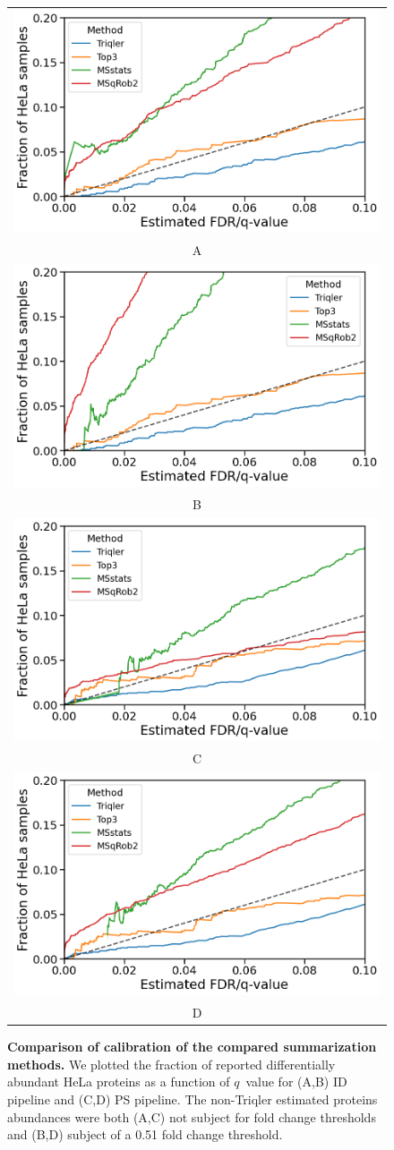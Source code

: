 \documentclass[11pt]{article}
\begin{document}
\begin{figure}[hbt]
    \centering
    \centering
    \begin{tabular}{c} 
        \includegraphics[width=0.5\linewidth]{../../result/report_plots_pipeline/calibration_ID_0.png} \\
        A \\ 
        \includegraphics[width=0.5\linewidth]{../../result/report_plots_pipeline/calibration_ID_0.51.png} \\
        B \\
        \includegraphics[width=0.5\linewidth]{../../result/report_plots_pipeline/calibration_PS_0.png} \\
        C \\
        \includegraphics[width=0.5\linewidth]{../../result/report_plots_pipeline/calibration_PS_0.51.png} \\
        D 
    \end{tabular}
  \caption{{\bf Comparison of calibration of the compared summarization methods.} We plotted the fraction of reported differentially abundant HeLa proteins as a function of $q$~value for (A,B) ID pipeline and (C,D) PS pipeline. The non-Triqler  estimated proteins abundances were both (A,C) not subject for fold change thresholds and (B,D) subject of a 0.51 fold change threshold. \label{fig:frac_hela_vs_fdr_supp}}
\end{figure}
\end{document}
